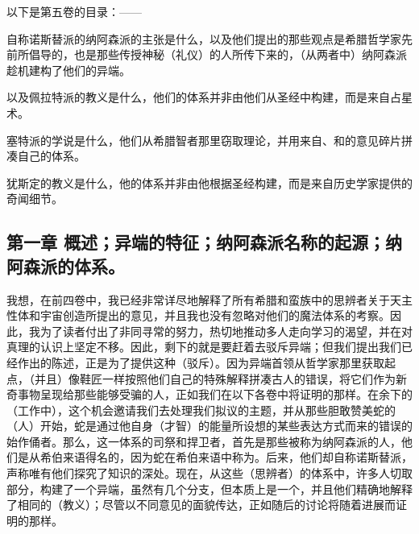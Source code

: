 以下是第五卷的目录：——\par

自称诺斯替派的纳阿森派的主张是什么，以及他们提出的那些观点是希腊哲学家先前所倡导的，也是那些传授神秘（礼仪）的人所传下来的，（从两者中）纳阿森派趁机建构了他们的异端。\par

以及佩拉特派的教义是什么，他们的体系并非由他们从圣经中构建，而是来自占星术。\par

塞特派的学说是什么，他们从希腊智者那里窃取理论，并用来自、和的意见碎片拼凑自己的体系。\par

犹斯定的教义是什么，他的体系并非由他根据圣经构建，而是来自历史学家提供的奇闻细节。\par


\subsection{第一章 概述；异端的特征；纳阿森派名称的起源；纳阿森派的体系。}

我想，在前四卷中，我已经非常详尽地解释了所有希腊和蛮族中的思辨者关于天主性体和宇宙创造所提出的意见，并且我也没有忽略对他们的魔法体系的考察。因此，我为了读者付出了非同寻常的努力，热切地推动多人走向学习的渴望，并在对真理的认识上坚定不移。因此，剩下的就是要赶着去驳斥异端；但我们提出我们已经作出的陈述，正是为了提供这种（驳斥）。因为异端首领从哲学家那里获取起点，（并且）像鞋匠一样按照他们自己的特殊解释拼凑古人的错误，将它们作为新奇事物呈现给那些能够受骗的人，正如我们在以下各卷中将证明的那样。在余下的（工作中），这个机会邀请我们去处理我们拟议的主题，并从那些胆敢赞美蛇的（人）开始，蛇是通过他自身（才智）的能量所设想的某些表达方式而来的错误的始作俑者。那么，这一体系的司祭和捍卫者，首先是那些被称为纳阿森派的人，他们是从希伯来语得名的，因为蛇在希伯来语中称为。后来，他们却自称诺斯替派，声称唯有他们探究了知识的深处。现在，从这些（思辨者）的体系中，许多人切取部分，构建了一个异端，虽然有几个分支，但本质上是一个，并且他们精确地解释了相同的（教义）；尽管以不同意见的面貌传达，正如随后的讨论将随着进展而证明的那样。\par

